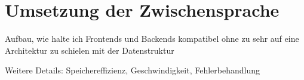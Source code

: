 \chapter{Umsetzung der Zwischensprache}
\label{chapter}

Aufbau, wie halte ich Frontends und Backends kompatibel ohne zu sehr auf eine Architektur zu schielen mit der Datenstruktur

Weitere Details: Speichereffizienz, Geschwindigkeit, Fehlerbehandlung



